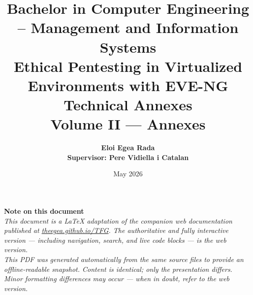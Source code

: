 \documentclass[a4paper, twoside, 12pt, openright]{report}
\title{
    \fontsize{14pt}{0pt}\textbf{Bachelor in Computer Engineering -- Management and Information Systems} \\
    \vspace*{2cm}
    \textbf{Ethical Pentesting in Virtualized Environments with EVE-NG} \\
    \vspace*{1cm}
    \textbf{Technical Annexes} \\
    \textbf{Volume II --- Annexes}
    \vspace*{5cm}
}
\author{
    \fontsize{14pt}{0pt}
    \textbf{Eloi Egea Rada} \\
    \textbf{Supervisor: Pere Vidiella i Catalan}
}
\date{May 2026}
\begin{document}
\maketitle
\newpage
\thispagestyle{empty}
\null
\newpage


\thispagestyle{empty}
\null\vfill
\begin{flushright}
\begin{minipage}{0.72\textwidth}
{\normalfont\large\bfseries Note on this document}\\[0.8em]
{\itshape
This document is a LaTeX adaptation of the companion web documentation
published at \href{https://theegea.github.io/TFG}{theegea.github.io/TFG}.
The authoritative and fully interactive version --- including navigation,
search, and live code blocks --- is the web version.
\\[0.6em]
This PDF was generated automatically from the same source files
to provide an offline-readable snapshot. Content is identical;
only the presentation differs. Minor formatting differences may occur
--- when in doubt, refer to the web version.
}
\end{minipage}
\end{flushright}
\vfill\null\cleardoublepage

\tableofcontents
\cleardoublepage

\onehalfspacing
\setlength{\parskip}{12pt}


\cleardoublepage

\cleardoublepage

\cleardoublepage

\cleardoublepage

\cleardoublepage

\cleardoublepage

\cleardoublepage

\cleardoublepage

\cleardoublepage

\cleardoublepage

\cleardoublepage

\cleardoublepage

\cleardoublepage

\cleardoublepage




\cleardoublepage




\cleardoublepage

\end{document}
